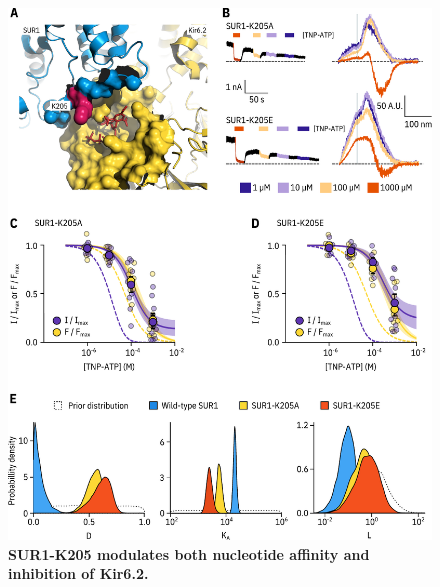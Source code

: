 \documentclass[10pt,lineno, doublespacing]{elife_modified}
\begin{document}
\begin{figure}
\begin{fullwidth}
\centering
\includegraphics[height=0.95\textheight]{figure_five}
\caption{\textbf{SUR1-K205 modulates both nucleotide affinity and inhibition of Kir6.2.}}
\label{fig:five}
\end{fullwidth}
\end{figure}
\end{document}
